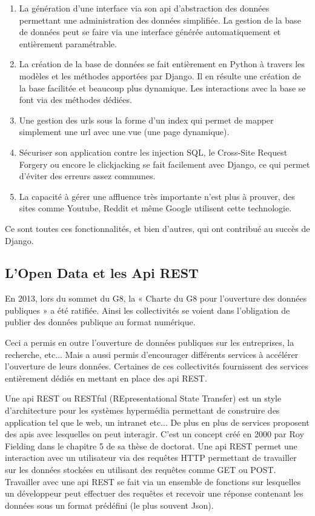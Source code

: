 \documentclass[french]{article}
\begin{document}
{\begin{enumerate}
    \item La génération d'une interface via son api d'abstraction des données permettant une administration des données simplifiée. La gestion de la base de données peut se faire via une interface générée automatiquement et entièrement paramétrable.
    \item La création de la base de données se fait entièrement en Python à travers les modèles et les méthodes apportées par Django. Il en résulte une création de la base facilitée et beaucoup plus dynamique. Les interactions avec la base se font via des méthodes dédiées.
    \item Une gestion des urls sous la forme d'un index qui permet de mapper simplement une url avec une vue (une page dynamique).
    \item Sécuriser son application contre les injection SQL, le Cross-Site Request Forgery ou encore le clickjacking se fait facilement avec Django, ce qui permet d'éviter des erreurs assez communes.
    \item La capacité à gérer une affluence très importante n'est plus à prouver, des sites comme Youtube, Reddit et même Google utilisent cette technologie.
\end{enumerate}
Ce sont toutes ces fonctionnalités, et bien d'autres, qui ont contribué au succès de Django.

\subsection{L'Open Data et les Api REST}

En 2013, lors du sommet du G8, la « Charte du G8 pour l'ouverture des données publiques »  a été ratifiée. Ainsi les collectivités se voient dans l'obligation de publier des données publique au format numérique. \cite{wiki-open-data}

Ceci a permis en outre l'ouverture de données publiques sur les entreprises, la recherche, etc... Mais a aussi permis d'encourager différents services à accélérer l'ouverture de leurs données.
Certaines de ces collectivités fournissent des services entièrement dédiés en mettant en place des api REST.

Une api REST ou RESTful (REpresentational State Transfer) est un style d'architecture pour les systèmes hypermédia permettant de construire des application tel que le web, un intranet etc... De plus en plus de services proposent des apis avec lesquelles on peut interagir. C'est un concept créé en 2000 par Roy Fielding dans le chapitre 5 de sa thèse de doctorat. \cite{roy}
\newline{}
Une api REST permet une interaction avec un utilisateur via des requêtes HTTP permettant de travailler sur les données stockées en utilisant des requêtes comme GET ou POST.
\newline{}
Travailler avec une api REST se fait via un ensemble de fonctions sur lesquelles un développeur peut effectuer des requêtes et recevoir une réponse contenant les données sous un format prédéfini (le plus souvent Json).

}
\end{document}

